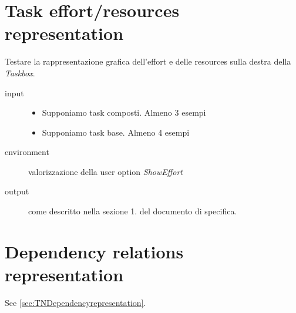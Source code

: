 \section{Task effort/resources representation}
Testare la rappresentazione grafica dell'effort e delle resources sulla destra
della \emph{Taskbox}.
\begin{description}
\item[input]  \quad
\begin{itemize}
  \item Supponiamo task composti. Almeno 3 esempi
  \item Supponiamo task base. Almeno 4 esempi
\end{itemize}
\item[environment] valorizzazione della user option \emph{ShowEffort}
\item[output] come descritto nella sezione 1. del
documento di specifica.
\end{description}

\section{Dependency relations representation}
See \ref{sec:TNDependencyrepresentation}.

